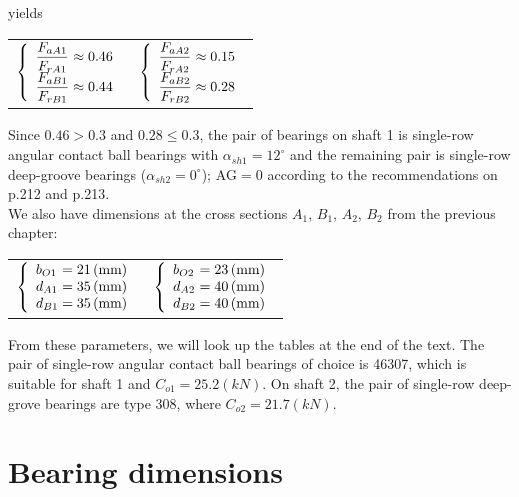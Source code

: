yields\vskip2mm
{\centering
	\begin{tabular}[t]{p{7cm}p{7cm}}
		$
		\left\{ 
		\begin{array}{l@{{} \approx {}}l}
		\dfrac{F_{aA1}}{F_{rA1}} & 0.46 \\
		\dfrac{F_{aB1}}{F_{rB1}} & 0.44 \\
		\end{array}
		\right.$
		& $
		\left\{ 
		\begin{array}{l@{{} \approx {}}l}
		\dfrac{F_{aA2}}{F_{rA2}} & 0.15 \\
		\dfrac{F_{aB2}}{F_{rB2}} & 0.28 \\
		\end{array}
		\right.$
\end{tabular}}\vskip2mm
Since $ 0.46>0.3 $ and $ 0.28\leq0.3 $, the pair of bearings on shaft 1 is single-row angular contact ball bearings with $ \alpha_{sh1} = 12^\circ$ and the remaining pair is single-row deep-groove bearings ($ \alpha_{sh2} = 0^\circ $); $ \text{AG} = 0 $ according to the recommendations on p.212 and p.213.\\
We also have dimensions at the cross sections $ A_1 $, $ B_1 $, $ A_2 $, $ B_2 $ from the previous chapter:\vskip2mm
{\centering
	\begin{tabular}[t]{p{6cm}p{7cm}}
		$
		\left\{ 
		\begin{array}{l@{{} = {}}l}
		b_{O1} & 21\unit{(mm)}\\
		d_{A1} & 35\unit{(mm)}\\
		d_{B1} & 35\unit{(mm)}\\
		\end{array}
		\right.$
		& $
		\left\{ 
		\begin{array}{l@{{} = {}}l}
		b_{O2} & 23\unit{(mm)}\\
		d_{A2} & 40\unit{(mm)}\\
		d_{B2} & 40\unit{(mm)}\\
		\end{array}
		\right.$
\end{tabular}}\vskip2mm
From these parameters, we will look up the tables at the end of the text. The pair of single-row angular contact ball bearings of choice is 46307, which is suitable for shaft 1 and $ C_{o1} = 25.2\unit{(kN)} $. On shaft 2, the pair of single-row deep-grove bearings are type 308, where $ C_{o2}=21.7\unit{(kN)} $.

\section{Bearing dimensions}
